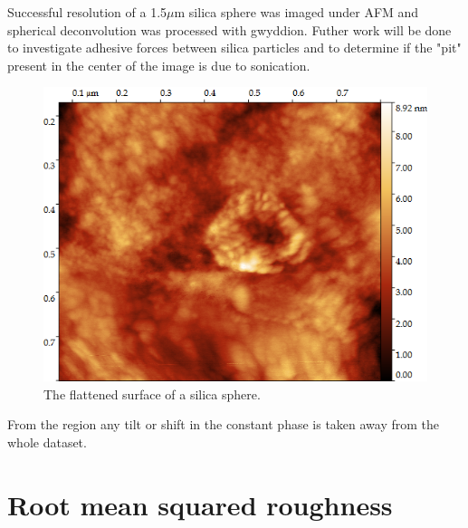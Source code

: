 Successful resolution of a 1.5$\mu$m silica sphere was imaged under AFM and spherical deconvolution was processed with gwyddion. \cite{gwy} Futher work will be done to investigate adhesive forces between silica particles and to determine if the "pit" present in the center of the image is due to sonication.

\begin{figure}[h]     %
        \begin{center}
          \includegraphics[width=130mm]{chapter3/Sili2.png}
\end{center}
\caption{The flattened surface of a silica sphere.}
\label{fig:Sili2}                 %
\end{figure}


From the region any tilt or shift in the constant phase is taken away from the whole dataset. %



\section{Root mean squared roughness}



\newpage